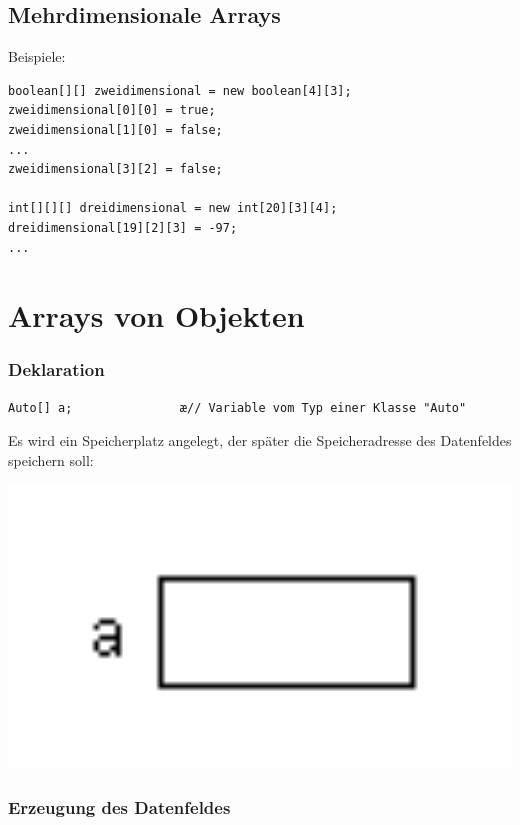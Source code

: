 \subsection{Mehrdimensionale Arrays}

Beispiele:

\begin{lstlisting}
boolean[][] zweidimensional = new boolean[4][3];
zweidimensional[0][0] = true; 
zweidimensional[1][0] = false;
... 
zweidimensional[3][2] = false;

int[][][] dreidimensional = new int[20][3][4]; 
dreidimensional[19][2][3] = -97;
...
\end{lstlisting}


\section{Arrays von Objekten}

\subsubsection{Deklaration}

\begin{lstlisting}
Auto[] a;               æ// Variable vom Typ einer Klasse "Auto"
\end{lstlisting}

Es wird ein Speicherplatz angelegt, der später die Speicheradresse des
Datenfeldes speichern soll:

\begin{minipage}{0.15\textwidth}
\includegraphics[width=1.0\textwidth]{./inf/SEKII/18_Java_Arrays/Deklaration.png}
\end{minipage}

\subsubsection{Erzeugung des Datenfeldes}

